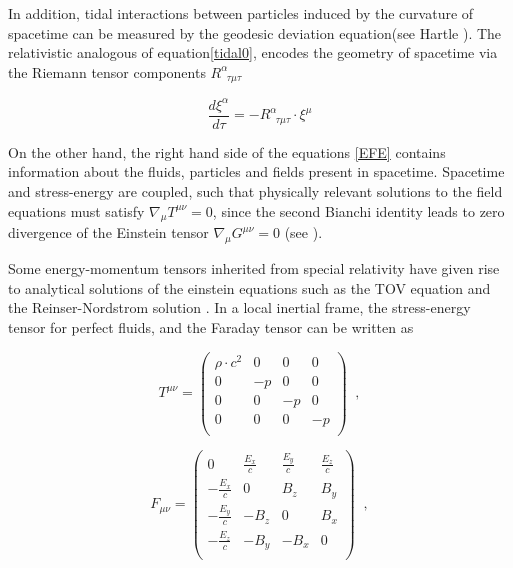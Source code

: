 In addition, tidal interactions between particles induced by the curvature of spacetime can be measured by the geodesic deviation equation(see Hartle \cite[chapter X]{Hartle:2021pel}). The relativistic analogous of equation\ref{tidal0}, encodes the geometry of spacetime via the Riemann tensor components $R^{\alpha}_{\;\; \tau \mu \tau}$

\begin{equation}\label{tidal1}
\frac{d \xi^{\alpha}}{d\tau} = - R^{\alpha}_{\;\; \tau \mu \tau} \cdot \xi^{\mu}
\end{equation} 


On the other hand, the right hand side of the equations \ref{EFE} contains information about the fluids, particles and fields present in spacetime. Spacetime and stress-energy are coupled, such that physically relevant solutions to the field equations must satisfy $\nabla_{\mu} T^{\mu\nu} = 0$, since the second Bianchi identity leads to zero divergence of the Einstein tensor $\nabla_{\mu}G^{\mu\nu} = 0$ (see \cite{inverno, Wald:1984rg, Weinberg:1972kfs}).

Some energy-momentum tensors inherited from special relativity have given rise to analytical solutions of the einstein equations such as the TOV equation \cite{PhysRev.55.374} and the Reinser-Nordstrom solution \cite{https://doi.org/10.1002/andp.19163550905}. In a local inertial frame, the stress-energy tensor for perfect fluids, and the Faraday tensor can be written as


\begin{equation}\label{PF}
T^{\mu \nu} = 
\begin{pmatrix}
\rho \cdot c^2&0&0&0 \\
0&-p&0&0 \\
0&0&-p&0 \\
0&0&0&-p\\
\end{pmatrix} \;\; ,
\end{equation}

\begin{equation}
F_{\mu \nu} = 
\begin{pmatrix}
0&\frac{E_x}{c}&\frac{E_y}{c}&\frac{E_z}{c} \\
-\frac{E_x}{c} &0   &B_z  &B_y \\
-\frac{E_y}{c} &-B_z&0    &B_x \\
-\frac{E_z}{c} &-B_y&-B_x &0\\
\end{pmatrix} \;\;,
\end{equation}


